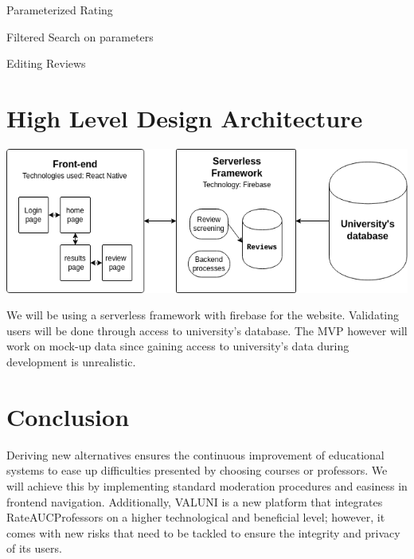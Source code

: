 \documentclass{article}
\begin{document}
	\quad Parameterized Rating

	\quad Filtered Search on parameters	

	\quad Editing Reviews


\section{High Level Design Architecture}

\begin{center} 
	\includegraphics[scale=0.5]{./projectUml.drawio.png}
\end{center}

\quad We will be using a serverless framework with firebase for the website. Validating users will be done through access to university's database. The MVP however will work on mock-up data since gaining access to university's data during development is unrealistic.

\section{Conclusion}

\quad Deriving new alternatives ensures the continuous improvement of educational systems to ease up difficulties presented by choosing courses or professors. We will achieve this by implementing standard moderation procedures and easiness in frontend navigation. Additionally,  VALUNI is a new platform that integrates RateAUCProfessors on a higher technological and beneficial level; however, it comes with new risks that need to be tackled to ensure the integrity and privacy of its users. 
\end{document}
